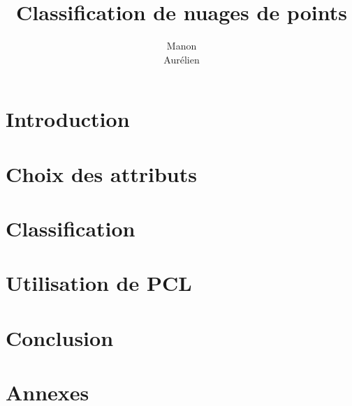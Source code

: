\documentclass[12pt,titlepage,a4paper]{report}
\title{Classification de nuages de points}
\author{Manon \bsc{Ansart}\\ Aurélien \bsc{Massiot}}
\begin{document}

	\dominitoc
	\tableofcontents

	\chapter{Introduction}
		
	\chapter{Choix des attributs}
		
    \chapter{Classification}
		
    \chapter{Utilisation de PCL}
		
	\chapter{Conclusion}
		

	\nocite{*} %
	

	\chapter{Annexes}
		
\end{document}
